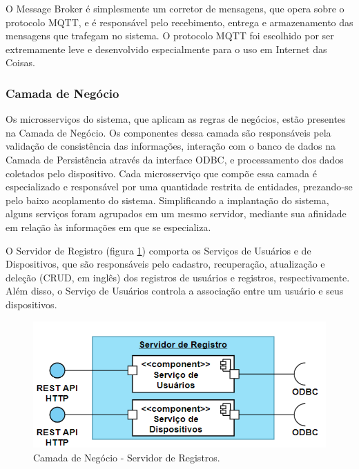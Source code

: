 O Message Broker é simplesmente um corretor de mensagens, que opera sobre o protocolo MQTT, e é responsável pelo recebimento, entrega e armazenamento das mensagens que trafegam no sistema. O protocolo MQTT foi escolhido por ser extremamente leve e desenvolvido especialmente para o uso em Internet das Coisas.
    
\subsubsection{Camada de Negócio}

Os microsserviços do sistema, que aplicam as regras de negócios, estão presentes na Camada de Negócio. Os componentes dessa camada são responsáveis pela validação de consistência das informações, interação com o banco de dados na Camada de Persistência através da interface ODBC, e processamento dos dados coletados pelo dispositivo. Cada microsserviço que compõe essa camada é especializado e responsável por uma quantidade restrita de entidades, prezando-se pelo baixo acoplamento do sistema. Simplificando a implantação do sistema, alguns serviços foram agrupados em um mesmo servidor, mediante sua afinidade em relação às informações em que se especializa.

O Servidor de Registro (figura \ref{fig:camada_negocios_registro}) comporta os Serviços de Usuários e de Dispositivos, que são responsáveis pelo cadastro, recuperação, atualização e deleção  (CRUD, em inglês) dos registros de usuários e registros, respectivamente. Além disso, o Serviço de Usuários controla a associação entre um usuário e seus dispositivos.

\begin{figure}[h]
    \centering
    \includegraphics[scale=0.50]{figuras/projeto/software/camada_negocios_registro.PNG}
    \caption{Camada de Negócio - Servidor de Registros.}
    \label{fig:camada_negocios_registro}
\end{figure}


